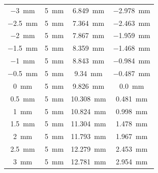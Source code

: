 \begin{table}[ht]
\begin{tabular}{| c | c | c | c |}
        \SI{-3}{mm}           & \SI{5}{mm}     & \SI{6.849}{mm}      & \SI{-2.978}{mm}   \\
        \SI{-2.5}{mm}         & \SI{5}{mm}     & \SI{7.364}{mm}      & \SI{-2.463}{mm}   \\
        \SI{-2}{mm}           & \SI{5}{mm}     & \SI{7.867}{mm}      & \SI{-1.959}{mm}   \\
        \SI{-1.5}{mm}         & \SI{5}{mm}     & \SI{8.359}{mm}      & \SI{-1.468}{mm}   \\
        \SI{-1}{mm}           & \SI{5}{mm}     & \SI{8.843}{mm}      & \SI{-0.984}{mm}   \\
        \SI{-0.5}{mm}         & \SI{5}{mm}     & \SI{9.34}{mm}       & \SI{-0.487}{mm}   \\
        \SI{0}{mm}            & \SI{5}{mm}     & \SI{9.826}{mm}      & \SI{0.0}{mm}      \\
        \SI{0.5}{mm}          & \SI{5}{mm}     & \SI{10.308}{mm}     & \SI{0.481}{mm}    \\
        \SI{1}{mm}            & \SI{5}{mm}     & \SI{10.824}{mm}     & \SI{0.998}{mm}    \\
        \SI{1.5}{mm}          & \SI{5}{mm}     & \SI{11.304}{mm}     & \SI{1.478}{mm}    \\
        \SI{2}{mm}            & \SI{5}{mm}     & \SI{11.793}{mm}     & \SI{1.967}{mm}    \\
        \SI{2.5}{mm}          & \SI{5}{mm}     & \SI{12.279}{mm}     & \SI{2.453}{mm}    \\
        \SI{3}{mm}            & \SI{5}{mm}     & \SI{12.781}{mm}     & \SI{2.954}{mm}    \\
        \hline
    \end{tabular}
    \label{tab:d210}
\end{table}



